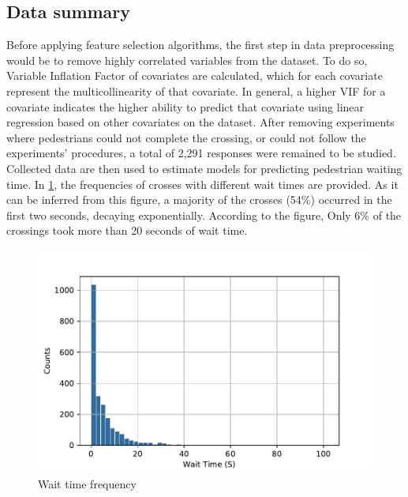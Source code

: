 \subsection{Data summary}
Before applying feature selection algorithms, the first step in data preprocessing would be to remove highly correlated variables from the dataset. To do so, Variable Inflation Factor of covariates are calculated, which for each covariate represent the multicollinearity of that covariate. In general, a higher VIF for a covariate indicates the higher ability to predict that covariate using linear regression based on other covariates on the dataset. After removing experiments where pedestrians could not complete the crossing, or could not follow the experiments' procedures, a total of 2,291 responses were remained to be studied. Collected data are then used to estimate models for predicting pedestrian waiting time. In \cref{fig:waitfreq}, the frequencies of crosses with different wait times are provided. As it can be inferred from this figure, a majority of the crosses (54\%) occurred in the first two seconds, decaying exponentially. According to the figure, Only 6\% of the crossings took more than 20 seconds of wait time.
\begin{figure}[]
    \centering
    \includegraphics[scale=0.6]{chapter_4/figures/waitfreq.pdf}
    \caption{Wait time frequency}
    \label{fig:waitfreq}
\end{figure}
